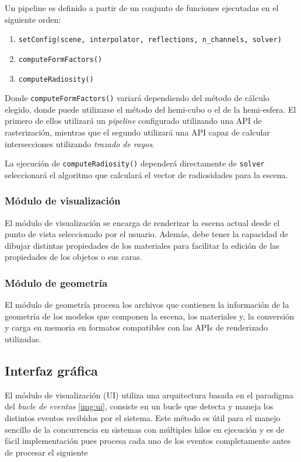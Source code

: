 Un pipeline es definido a partir de un conjunto de funciones ejecutadas en el siguiente orden:

\begin{enumerate}
	\item \verb|setConfig(scene, interpolator, reflections, n_channels, solver)|
	\item \verb|computeFormFactors()|
	\item \verb|computeRadiosity()|
\end{enumerate}

Donde \verb|computeFormFactors()| variará dependiendo del método de cálculo elegido, donde puede utilizarse el método del hemi-cubo o el de la hemi-esfera. El primero de ellos utilizará un \textit{pipeline} configurado utilizando una API de rasterización, mientras que el segundo utilizará una API capaz de calcular intersecciones utilizando \textit{trazado de rayos}.

La ejecución de \verb|computeRadiosity()| dependerá directamente de \verb|solver| seleccionará el algoritmo que calculará el vector de radiosidades para la escena.

\subsubsection{Módulo de visualización}

El módulo de visualización se encarga de renderizar la escena actual desde el punto de vista seleccionado por el usuario. Además, debe tener la capacidad de dibujar distintas propiedades de los materiales para facilitar la edición de las propiedades de los objetos o sus caras.

\subsubsection{Módulo de geometría}

El módulo de geometría procesa los archivos que contienen la información de la geometría de los modelos que componen la escena, los materiales y, la conversión y carga en memoria en formatos compatibles con las APIs de renderizado utilizadas.

\subsection{Interfaz gráfica}

El módulo de visualización (UI) utiliza una arquitectura basada en el paradigma del \textit{bucle de eventos} \ref{img:ui}, consiste en un bucle que detecta y maneja los distintos eventos recibidos por el sistema. Este método es útil para el manejo sencillo de la concurrencia en sistemas con múltiples hilos en ejecución y es de fácil implementación pues procesa cada uno de los eventos completamente antes de procesar el siguiente

